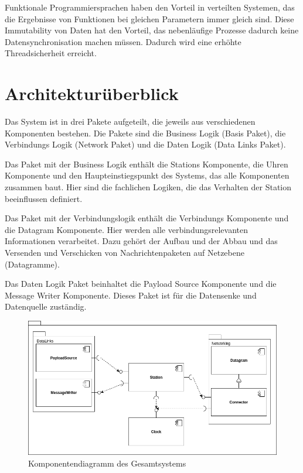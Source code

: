 \documentclass[draft=false
              ,paper=a4
              ,twoside=false
              ,fontsize=11pt
              ,headsepline
              ,BCOR10mm
              ,DIV11
              ]{scrbook}
\begin{document}
Funktionale Programmiersprachen haben den Vorteil in verteilten Systemen, das die Ergebnisse von Funktionen bei gleichen Parametern immer gleich sind. Diese Immutability von Daten hat den Vorteil, das nebenläufige Prozesse dadurch keine Datensynchronisation machen müssen. Dadurch wird eine erhöhte Threadsicherheit erreicht.

\section{Architekturüberblick}
Das System ist in drei Pakete aufgeteilt, die jeweils aus verschiedenen Komponenten bestehen.
Die Pakete sind die Business Logik (Basis Paket), die Verbindungs Logik (Network Paket) und die Daten Logik (Data Links Paket).

Das Paket mit der Business Logik enthält die Stations Komponente, die Uhren Komponente und den Haupteinstiegspunkt des Systems, das alle Komponenten zusammen baut. Hier sind die fachlichen Logiken, die das Verhalten der Station beeinflussen definiert.

Das Paket mit der Verbindungslogik enthält die Verbindungs Komponente und die Datagram Komponente. Hier werden alle verbindungsrelevanten Informationen verarbeitet. Dazu gehört der Aufbau und der Abbau und das Versenden und Verschicken von Nachrichtenpaketen auf Netzebene (Datagramme).

Das Daten Logik Paket beinhaltet die Payload Source Komponente und die Message Writer Komponente. Dieses Paket ist für die Datensenke und Datenquelle zuständig.

\begin{figure}[h]
\centering
\includegraphics[width=\textwidth]{component-diagram.png}
\caption[component-diagram]{Komponentendiagramm des Gesamtsystems}
\label{fig:component-diagram}
\end{figure}
\end{document}
